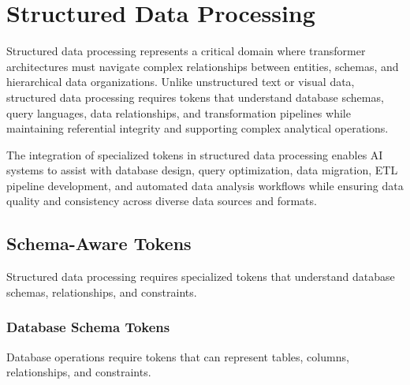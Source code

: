 
\section{Structured Data Processing}

Structured data processing represents a critical domain where transformer architectures must navigate complex relationships between entities, schemas, and hierarchical data organizations. Unlike unstructured text or visual data, structured data processing requires tokens that understand database schemas, query languages, data relationships, and transformation pipelines while maintaining referential integrity and supporting complex analytical operations.
\begin{comment}
Feedback: This is a good introduction. To make the core challenge more vivid, you could add: "The fundamental challenge in this domain is that the meaning of a token is almost entirely defined by its context within a rigid schema. The word 'Apple' in a `company_name` column means something completely different from 'Apple' in a `fruit_type` column. Special tokens are therefore essential for providing this schema-level context that is invisible in the raw data itself."
\end{comment}

The integration of specialized tokens in structured data processing enables AI systems to assist with database design, query optimization, data migration, ETL pipeline development, and automated data analysis workflows while ensuring data quality and consistency across diverse data sources and formats.

\subsection{Schema-Aware Tokens}

Structured data processing requires specialized tokens that understand database schemas, relationships, and constraints.

\subsubsection{Database Schema Tokens}

Database operations require tokens that can represent tables, columns, relationships, and constraints.
\begin{comment}
Feedback: Before linking to the code, it's crucial to explain the motivation. For example: "When a user asks, 'Show me the biggest customers,' a model must translate this into a valid SQL query. To do this, it needs to know that 'customers' maps to a table named `customers`, and 'biggest' likely refers to a column like `total_revenue`. Schema-aware tokens, such as `<TABLE>`, `<COLUMN>`, and `<KEY>`, are used to linearize the database schema into a sequence the transformer can understand. This allows the model to learn the mapping between natural language questions and the specific structural elements of the database."
\end{comment}

